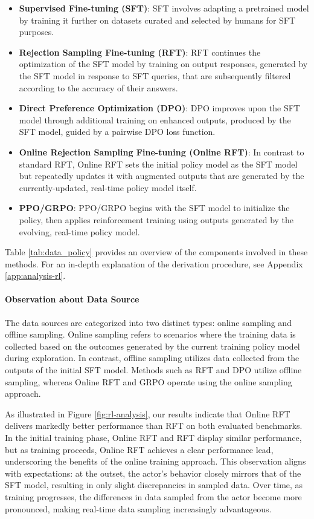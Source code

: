 \begin{itemize}[topsep=0pt]
\begin{itemize}[topsep=0pt]
\begin{itemize}
    \item  \textbf{Supervised Fine-tuning (SFT)}: SFT involves adapting a pretrained model by training it further on datasets curated and selected by humans for SFT purposes.
    \item \textbf{Rejection Sampling Fine-tuning (RFT)}: RFT continues the optimization of the SFT model by training on output responses, generated by the SFT model in response to SFT queries, that are subsequently filtered according to the accuracy of their answers.
    \item \textbf{Direct Preference Optimization (DPO)}: DPO improves upon the SFT model through additional training on enhanced outputs, produced by the SFT model, guided by a pairwise DPO loss function.
    \item \textbf{Online Rejection Sampling Fine-tuning (Online RFT)}: In contrast to standard RFT, Online RFT sets the initial policy model as the SFT model but repeatedly updates it with augmented outputs that are generated by the currently-updated, real-time policy model itself.
    \item \textbf{PPO/GRPO}: PPO/GRPO begins with the SFT model to initialize the policy, then applies reinforcement training using outputs generated by the evolving, real-time policy model.
\end{itemize}

Table \ref{tab:data_policy} provides an overview of the components involved in these methods. For an in-depth explanation of the derivation procedure, see Appendix \ref{app:analysis-rl}.

\paragraph{Observation about Data Source} The data sources are categorized into two distinct types: online sampling and offline sampling. Online sampling refers to scenarios where the training data is collected based on the outcomes generated by the current training policy model during exploration. In contrast, offline sampling utilizes data collected from the outputs of the initial SFT model. Methods such as RFT and DPO utilize offline sampling, whereas Online RFT and GRPO operate using the online sampling approach.

As illustrated in Figure \ref{fig:rl-analysis}, our results indicate that Online RFT delivers markedly better performance than RFT on both evaluated benchmarks. In the initial training phase, Online RFT and RFT display similar performance, but as training proceeds, Online RFT achieves a clear performance lead, underscoring the benefits of the online training approach. This observation aligns with expectations: at the outset, the actor's behavior closely mirrors that of the SFT model, resulting in only slight discrepancies in sampled data. Over time, as training progresses, the differences in data sampled from the actor become more pronounced, making real-time data sampling increasingly advantageous.


\end{itemize}
\end{itemize}
